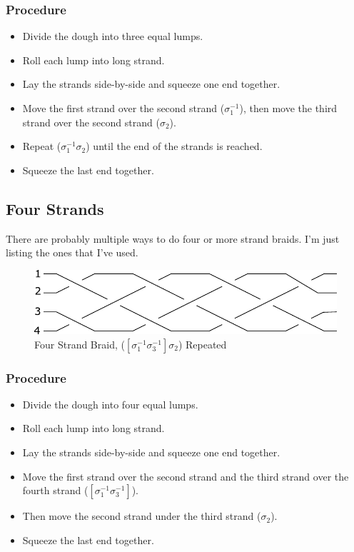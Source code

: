 \documentclass[10pt, openany]{book}
\begin{document}
\subsubsection{Procedure}
\begin{itemize}
  \item Divide the dough into three equal lumps.
  \item Roll each lump into long strand.
  \item Lay the strands side-by-side and squeeze one end together.
  \item Move the first strand over the second strand ($\sigma^{-1}_1$), then move the third strand over the second strand ($\sigma_2$).
  \item Repeat ($\sigma^{-1}_1\sigma_2$) until the end of the strands is reached.
  \item Squeeze the last end together.
\end{itemize}

\subsection{Four Strands}
There are probably multiple ways to do four or more strand braids.  I'm just listing the ones that I've used.

\begin{figure}[h]
  \center
  \includegraphics{Figures/4-strands.pdf}
  \caption{Four Strand Braid, ($[\sigma^{-1}_1\sigma^{-1}_3]\sigma_2$) Repeated}
  \label{fig:4Strand}
\end{figure}

\subsubsection{Procedure}
\begin{itemize}
  \item Divide the dough into four equal lumps.
  \item Roll each lump into long strand.
  \item Lay the strands side-by-side and squeeze one end together.
  \item Move the first strand over the second strand and the third strand over the fourth strand ($[\sigma^{-1}_1\sigma^{-1}_3]$).
  \item Then move the second strand under the third strand ($\sigma_2$).
  \item Squeeze the last end together.
\end{itemize}
\end{document}
